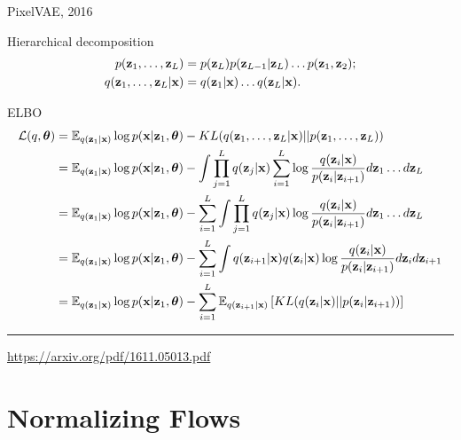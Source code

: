 \begin{frame}{PixelVAE, 2016}
	\begin{block}{Hierarchical decomposition}
		\vspace{-1cm}
		\begin{align*}
			p(\mathbf{z}_1, \dots, \mathbf{z}_L) &= p(\mathbf{z}_L) p(\mathbf{z}_{L-1} | \mathbf{z}_L) \dots p(\mathbf{z}_1, \mathbf{z}_2); \\
			q(\mathbf{z}_1, \dots, \mathbf{z}_L | \mathbf{x}) &= q(\mathbf{z}_1 | \mathbf{x}) \dots q(\mathbf{z}_L | \mathbf{x}).
		\end{align*}
	\end{block}
	\vspace{-0.5cm}
	\begin{block}{ELBO}
		\vspace{-0.5cm}
		{\footnotesize
			\begin{align*}
				\mathcal{L}(q, \boldsymbol{\theta}) &= \mathbb{E}_{q(\mathbf{z}_1 | \mathbf{x})} \log p(\mathbf{x} | \mathbf{z}_1, \boldsymbol{\theta}) - KL(q(\mathbf{z}_1, \dots, \mathbf{z}_L | \mathbf{x}) || p(\mathbf{z}_1, \dots, \mathbf{z}_L)) \\
				&= \mathbb{E}_{q(\mathbf{z}_1 | \mathbf{x})} \log p(\mathbf{x} | \mathbf{z}_1, \boldsymbol{\theta}) - \int \prod_{j=1}^L q(\mathbf{z}_j | \mathbf{x}) \sum_{i=1}^L \log \frac{q(\mathbf{z}_i | \mathbf{x})}{p(\mathbf{z}_i | \mathbf{z}_{i + 1})} d \mathbf{z}_1 \dots d \mathbf{z}_L \\
				&= \mathbb{E}_{q(\mathbf{z}_1 | \mathbf{x})} \log p(\mathbf{x} | \mathbf{z}_1, \boldsymbol{\theta}) - \sum_{i=1}^L \int \prod_{j=1}^L q(\mathbf{z}_j | \mathbf{x}) \log \frac{q(\mathbf{z}_i | \mathbf{x})}{p(\mathbf{z}_i | \mathbf{z}_{i + 1})} d \mathbf{z}_1 \dots d \mathbf{z}_L \\
				&= \mathbb{E}_{q(\mathbf{z}_1 | \mathbf{x})} \log p(\mathbf{x} | \mathbf{z}_1, \boldsymbol{\theta}) - \sum_{i=1}^L \int q(\mathbf{z}_{i+1} | \mathbf{x}) q(\mathbf{z}_i | \mathbf{x}) \log \frac{q(\mathbf{z}_i | \mathbf{x})}{p(\mathbf{z}_i | \mathbf{z}_{i + 1})} d \mathbf{z}_i d \mathbf{z}_{i+1} \\
				&= \mathbb{E}_{q(\mathbf{z}_1 | \mathbf{x})} \log p(\mathbf{x} | \mathbf{z}_1, \boldsymbol{\theta}) - \sum_{i=1}^L \mathbb{E}_{q(\mathbf{z}_{i+1} | \mathbf{x})} \left[ KL (q(\mathbf{z}_i | \mathbf{x}) || p(\mathbf{z}_i | \mathbf{z}_{i + 1}))\right]
			\end{align*}
		}
	\end{block}
	\vfill
	\hrule\medskip
	{\scriptsize \href{https://arxiv.org/pdf/1611.05013.pdf}{https://arxiv.org/pdf/1611.05013.pdf}}
\end{frame}
\section{Normalizing Flows}
